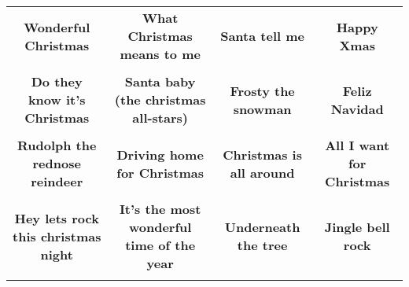 \documentclass[12pt]{article} \usepackage{eso-pic, graphicx}
\newcommand{\background}[1]{%
\AddToShipoutPictureBG*{\texttt{[image: \#1]}}
}
\begin{document}
\tabcolsep=30.2pt \renewcommand{\arraystretch}{4.5}   \vspace*{4.3cm} \begin{center}  \begin{tabular}{c c c c}
\parbox{3cm}{\centering \textbf{Wonderful Christmas}}& 
\parbox{3cm}{\centering \textbf{What Christmas means to me}}& 
\parbox{3cm}{\centering \textbf{Santa tell me}}& 
\parbox{3cm}{\centering \textbf{Happy Xmas}}\\ \\ 
\parbox{3cm}{\centering \textbf{Do they know it's Christmas}}& 
\parbox{3cm}{\centering \textbf{Santa baby (the christmas all-stars)}}& 
\parbox{3cm}{\centering \textbf{Frosty the snowman}}& 
\parbox{3cm}{\centering \textbf{Feliz Navidad}}\\ \\ 
\parbox{3cm}{\centering \textbf{Rudolph the rednose reindeer}}& 
\parbox{3cm}{\centering \textbf{Driving home for Christmas}}& 
\parbox{3cm}{\centering \textbf{Christmas is all around}}& 
\parbox{3cm}{\centering \textbf{All I want for Christmas}}\\ \\ 
\parbox{3cm}{\centering \textbf{Hey lets rock this christmas night}}& 
\parbox{3cm}{\centering \textbf{It’s the most wonderful time of the year}}& 
\parbox{3cm}{\centering \textbf{Underneath the tree}}& 
\parbox{3cm}{\centering \textbf{Jingle bell rock}}\\ \\ 
\end{tabular} \background{discobingo.pdf} \end{center} 
\end{document}

